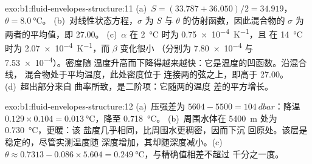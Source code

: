 \begin{solution}{exo:b1:fluid-envelopes-structure:11}
(a)~$S = (33.787 + 36.050)/2 = 34.919$，$\theta = \qty{8.0}{\celsius}$。
(b)~对线性状态方程，$\sigma$ 为 $S$ 与
$\theta$ 的仿射函数，因此混合物的 $\sigma$ 为两者的平均值，即 27.00。
(c)~$\alpha$ 在 \qty{2}{\celsius} 时为 \qty{0.75e-4}{K^{-1}}，且
在 \qty{14}{\celsius} 时为 \qty{2.07e-4}{K^{-1}}，而 $\beta$ 变化很小
（分别为 \num{7.80e-4} 与 \num{7.53e-4}）。密度随
温度升高而下降得越来越快：它是温度的凹函数。沿混合线，
混合物处于平均温度，此处密度位于
连接两的弦之上，即高于 27.00。(d)~超出部分来自
曲率所致，是二阶项：它随两的温度
差的平方增长。
\end{solution}

\begin{solution}{exo:b1:fluid-envelopes-structure:12}
(a)~压强差为 $5604 - 5500 = \qty{104}{dbar}$：降温
$0.129 \times 0.104 = \qty{0.013}{\celsius}$，降至 \qty{0.718}{\celsius}。
(b)~周围水体在 \qty{5400}{m} 处为 \qty{0.730}{\celsius}，更暖：该
盐度几乎相同，比周围水更稠密，因而下沉
回原处。该层是稳定的，尽管实测温度随
深度增加，其却随深度减小。(c)~$\theta \approx
0.7313 - 0.086 \times 5.604 = \qty{0.249}{\celsius}$，与精确值相差不超过
千分之一度。
\end{solution}

